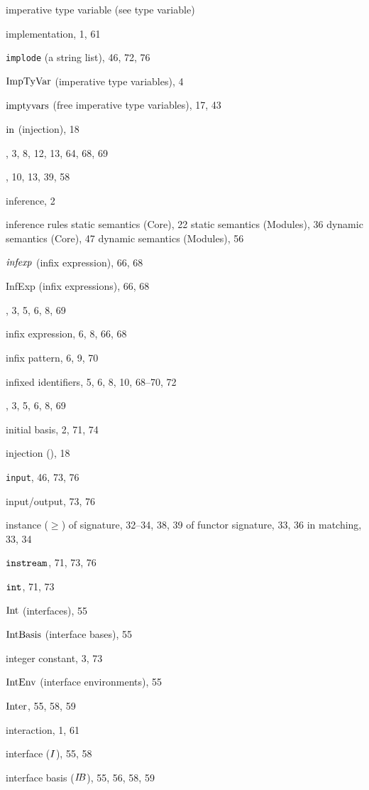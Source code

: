 \begin{theindex}
\item imperative type variable (see type variable) 
\item implementation, 1, 61
\item {\tt implode} (a string list), 46, 72, 76
\item ${\rm ImpTyVar}$ (imperative type variables), 4
\item $\mathop{\rm imptyvars}\nolimits$ (free imperative type variables), 17, 43
\item $\mbox{\rm in}$ (injection), 18
\item \IN, 3, 8, 12, 13, 64, 68, 69
\item \INCLUDE, 10, 13, 39, 58
\item inference, 2
\item inference rules 
\subitem static semantics (Core), 22
\subitem static semantics (Modules), 36
\subitem dynamic semantics (Core), 47
\subitem dynamic semantics (Modules), 56
\item ${\it infexp}$ (infix expression), 66, 68
\item InfExp (infix expressions), 66, 68
\item \INFIX, 3, 5, 6, 8, 69
\item infix expression, 6, 8, 66, 68
\item infix pattern, 6, 9, 70
\item infixed identifiers, 5, 6, 8, 10, 68--70, 72
\item \INFIXR, 3, 5, 6, 8, 69
\item initial basis, 2, 71, 74
\item injection (\In), 18
\item {\tt input}, 46, 73, 76
\item input/output, 73, 76
\item instance ($\geq$) 
\subitem of signature, 32--34, 38, 39
\subitem of functor signature, 33, 36
\subitem in matching, 33, 34
\item $\mbox{\tt instream}$, 71, 73, 76
\item $\mbox{\tt int}$, 71, 73
\item ${\rm Int}$ (interfaces), 55
\item ${\rm IntBasis}$ (interface bases), 55
\item integer constant, 3, 73
\item ${\rm IntEnv}$ (interface environments), 55
\item $\mathop{\rm Inter}\nolimits$, 55, 58, 59
\item interaction, 1, 61
\item interface ($I$), 55, 58
\item interface basis ($\mbox{$I\!B$}$), 55, 56, 58, 59

\end{theindex}
